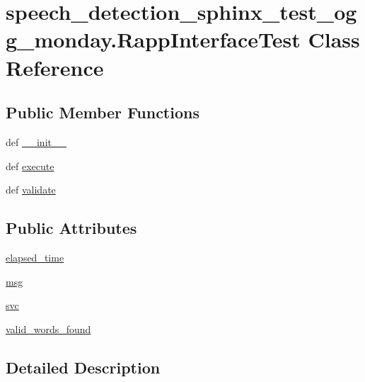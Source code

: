 \hypertarget{classspeech__detection__sphinx__test__ogg__monday_1_1RappInterfaceTest}{\section{speech\-\_\-detection\-\_\-sphinx\-\_\-test\-\_\-ogg\-\_\-monday.\-Rapp\-Interface\-Test Class Reference}
\label{classspeech__detection__sphinx__test__ogg__monday_1_1RappInterfaceTest}
}
\subsection*{Public Member Functions}
\begin{DoxyCompactItemize}
\item 
def \hyperlink{classspeech__detection__sphinx__test__ogg__monday_1_1RappInterfaceTest_a32105201d63bac09cd08255b2c8ccad4}{\-\_\-\-\_\-init\-\_\-\-\_\-}
\item 
def \hyperlink{classspeech__detection__sphinx__test__ogg__monday_1_1RappInterfaceTest_a48c50070e1142c74373069c4598e6729}{execute}
\item 
def \hyperlink{classspeech__detection__sphinx__test__ogg__monday_1_1RappInterfaceTest_aa7ff694f83649c9a23d6fbfce4b36ff2}{validate}
\end{DoxyCompactItemize}
\subsection*{Public Attributes}
\begin{DoxyCompactItemize}
\item 
\hyperlink{classspeech__detection__sphinx__test__ogg__monday_1_1RappInterfaceTest_a3f85fa18d4b2184f7bf358bba7670118}{elapsed\-\_\-time}
\item 
\hyperlink{classspeech__detection__sphinx__test__ogg__monday_1_1RappInterfaceTest_a5f58a50e17298dbe5a57f5423704f13a}{msg}
\item 
\hyperlink{classspeech__detection__sphinx__test__ogg__monday_1_1RappInterfaceTest_a07aca31a802a220c656613356688fed6}{svc}
\item 
\hyperlink{classspeech__detection__sphinx__test__ogg__monday_1_1RappInterfaceTest_a4cc4a37f471fb42e382e3bdc66c0a610}{valid\-\_\-words\-\_\-found}
\end{DoxyCompactItemize}


\subsection{Detailed Description}


